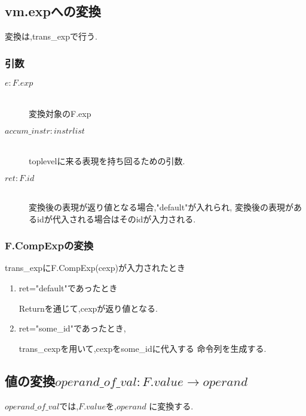 \subsection*{vm.expへの変換}

変換は,trans\_expで行う.

\subsubsection*{引数}

\begin{description}

\item[$e: F.exp$] \hfill \\
変換対象のF.exp

\item[$accum\_instr: instr list$] \hfill \\
toplevelに来る表現を持ち回るための引数.

\item[$ret: F.id$] \hfill \\
変換後の表現が返り値となる場合,"default"が入れられ,
変換後の表現があるidが代入される場合はそのidが入力される.
\end{description}

\subsubsection*{F.CompExpの変換}

trans\_expにF.CompExp(cexp)が入力されたとき

\begin{enumerate}

\item ret="default"であったとき

    Returnを通じて,cexpが返り値となる.

\item ret="some\_id"であったとき,

    trans\_cexpを用いて,cexpをsome\_idに代入する 命令列を生成する.
    
\end{enumerate}


\subsection*{値の変換$operand\_of\_val: F.value \rightarrow operand$}

$operand\_of\_val$では,$F.value$を,$operand$ に変換する.


